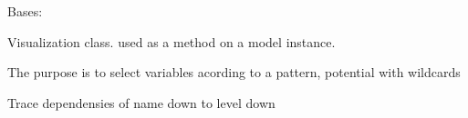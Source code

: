 \documentclass[letterpaper,10pt,english]{sphinxmanual}
\begin{document}
\begin{fulllineitems}
\label{\detokenize{vis/modelvis:modelvis.varvis}}
\pysigstartsignatures
{}
\pysigstopsignatures
\sphinxAtStartPar
Bases: 

\sphinxAtStartPar
Visualization class. used as a method on a model instance.

\sphinxAtStartPar
The purpose is to select variables acording to a pattern, potential with wildcards

\begin{fulllineitems}
\label{\detokenize{vis/modelvis:modelvis.varvis.explain}}
\pysigstartsignatures
{}
\pysigstopsignatures
\end{fulllineitems}


\begin{fulllineitems}
\label{\detokenize{vis/modelvis:modelvis.varvis.draw}}
\pysigstartsignatures
{}
\pysigstopsignatures
\end{fulllineitems}


\begin{fulllineitems}
\label{\detokenize{vis/modelvis:modelvis.varvis.tracedep}}
\pysigstartsignatures
{}
\pysigstopsignatures
\sphinxAtStartPar
Trace dependensies of name down to level down

\end{fulllineitems}



\end{fulllineitems}
\end{document}
